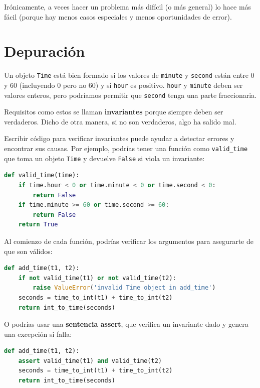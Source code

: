 Irónicamente, a veces hacer un problema más difícil (o más general) lo hace más fácil (porque hay menos casos especiales y menos oportunidades de error).

\section{Depuración}

Un objeto \texttt{Time} está bien formado si los valores de \texttt{minute} y \texttt{second} están entre 0 y 60 (incluyendo 0 pero no 60) y si \texttt{hour} es positivo. \texttt{hour} y \texttt{minute} deben ser valores enteros, pero podríamos permitir que \texttt{second} tenga una parte fraccionaria.

Requisitos como estos se llaman \textbf{invariantes} porque siempre deben ser verdaderos. Dicho de otra manera, si no son verdaderos, algo ha salido mal.

Escribir código para verificar invariantes puede ayudar a detectar errores y encontrar sus causas. Por ejemplo, podrías tener una función como \texttt{valid\_time} que toma un objeto \texttt{Time} y devuelve \texttt{False} si viola un invariante:

\begin{lstlisting}[language=Python]
def valid_time(time):
    if time.hour < 0 or time.minute < 0 or time.second < 0:
        return False
    if time.minute >= 60 or time.second >= 60:
        return False
    return True
\end{lstlisting}

Al comienzo de cada función, podrías verificar los argumentos para asegurarte de que son válidos:

\begin{lstlisting}[language=Python]
def add_time(t1, t2):
    if not valid_time(t1) or not valid_time(t2):
        raise ValueError('invalid Time object in add_time')
    seconds = time_to_int(t1) + time_to_int(t2)
    return int_to_time(seconds)
\end{lstlisting}

O podrías usar una \textbf{sentencia assert}, que verifica un invariante dado y genera una excepción si falla:

\begin{lstlisting}[language=Python]
def add_time(t1, t2):
    assert valid_time(t1) and valid_time(t2)
    seconds = time_to_int(t1) + time_to_int(t2)
    return int_to_time(seconds)
\end{lstlisting}

